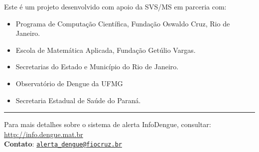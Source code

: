 \documentclass[10pt]{article} %
\begin{document}
\begin{minipage}[t]{1\linewidth}
\hypertarget{creditos}{}

Este é um projeto desenvolvido com apoio da SVS/MS em parceria com:

\begin{itemize}
\item Programa de Computação Científica, Fundação Oswaldo Cruz, Rio de Janeiro.
\item Escola de Matemática Aplicada, Fundação Getúlio Vargas.
\item Secretarias do Estado e Município do Rio de Janeiro.
\item Observatório de Dengue da UFMG
\item Secretaria Estadual de Saúde do Paraná.
\end{itemize}

      \BackToContents %

\vspace{1cm}

\hrule
Para mais detalhes sobre o sistema de alerta InfoDengue, consultar: \url{http://info.dengue.mat.br}\\

\textbf{Contato}: \href{alerta\_dengue@fiocruz.br}{\nolinkurl{alerta\_dengue@fiocruz.br} }
\end{minipage} %
\end{document}
